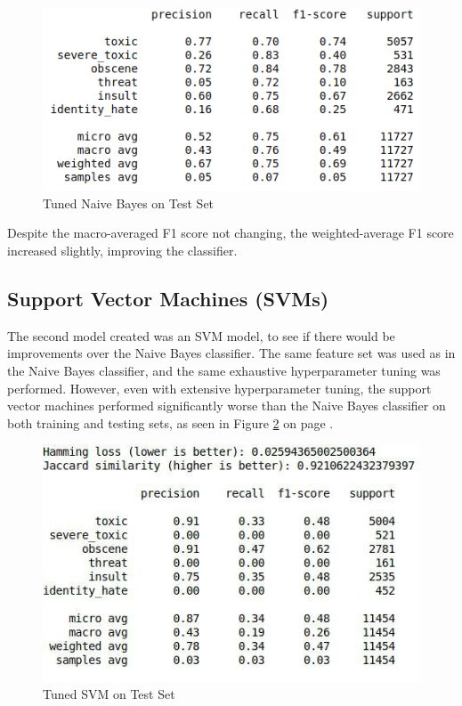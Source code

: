 \documentclass{article}
\begin{document}
{{	  \begin{figure}[h]
		  \centering
		  \includegraphics[width=\textwidth]{nb-test-set.png}
		  \caption{Tuned Naive Bayes on Test Set}
		  \label{fig:nb-test}
	  \end{figure}

	  Despite the macro-averaged F1 score not changing, the weighted-average F1
	  score increased slightly, improving the classifier.
  }
  \subsection{Support Vector Machines (SVMs)}{
	  The second model created was an SVM model, to see if there would be
	  improvements over the Naive Bayes classifier. The same feature set was used
	  as in the Naive Bayes classifier, and the same exhaustive hyperparameter
	  tuning was performed. However, even with extensive hyperparameter tuning,
	  the support vector machines performed significantly worse than the Naive
	  Bayes classifier on both training and testing sets, as seen in Figure
	  \ref{fig:svm-test} on page \pageref{fig:svm-test}.

	  \begin{figure}[h]
		  \centering
		  \includegraphics[width=\textwidth]{svm-test-set.jpg}
		  \caption{Tuned SVM on Test Set}
		  \label{fig:svm-test}
	  \end{figure}
  }
}
\end{document}
